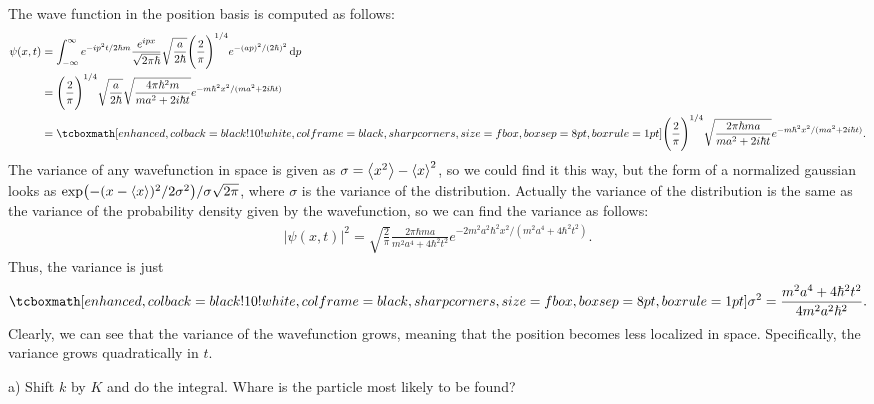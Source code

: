 The wave function in the position basis is computed as follows:
\begin{align}
    \label{eq:compute-psi-x}
    \psi(x,t) &= \int_{-\infty}^{\infty} e^{-ip^2t/2\hbar m} \frac{e^{ipx}}{\sqrt{2\pi\hbar}} \sqrt{\frac{a}{2\hbar}}\Bigg( \frac{2}{\pi} \Bigg)^{1/4} e^{-(ap)^2/(2\hbar)^2} \dd{p} \\
              &= \Bigg( \frac{2}{\pi} \Bigg)^{1/4} \sqrt{\frac{a}{2\hbar}} \sqrt{\frac{4\pi\hbar^2m}{ma^2 + 2i\hbar t}} e^{-m\hbar^2 x^2/(ma^2 + 2i\hbar t)} \\
              &= \eqbox{ \Bigg( \frac{2}{\pi} \Bigg)^{1/4} \sqrt{\frac{2\pi\hbar ma}{ma^2 + 2i\hbar t}} e^{-m\hbar^2x^2/(ma^2 + 2i\hbar t)} }
.\end{align}
The variance of any wavefunction in space is given as $\sigma = \expval{x^2} - \expval{x}^2$, so we could find it this way, but the form of a normalized gaussian looks as $\exp(-(x-\expval{x})^2/2\sigma^2)/\sigma\sqrt{2\pi}$, where $\sigma$ is the variance of the distribution.
Actually the variance of the distribution is the same as the variance of the probability density given by the wavefunction, so we can find the variance as follows:
\begin{eqnarray}
    \label{eq:distribution}
    |\psi(x,t)|^2 = \sqrt{\frac{2}{\pi}} \frac{2\pi\hbar ma}{m^2a^{4} + 4\hbar^2t^2} e^{-2m^2a^2\hbar^2x^2/(m^2a^4+4\hbar^2t^2)}
.\end{eqnarray}
Thus, the variance is just
\begin{eqnarray}
    \label{eq:variance}
    \eqbox{
    \sigma^2 = \frac{m^2a^4 + 4\hbar^2t^2}{4m^2a^2\hbar^2} 
}
.\end{eqnarray}
Clearly, we can see that the variance of the wavefunction grows, meaning that the position becomes less localized in space.
Specifically, the variance grows quadratically in $t$.




a) Shift $k$ by $K$ and do the integral.
Whare is the particle most likely to be found?

